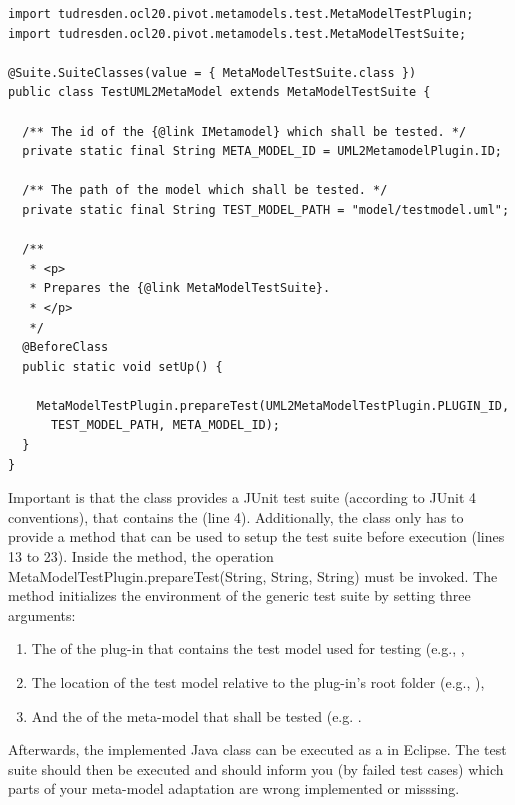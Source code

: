 \lstset{
  language=Java
}
\begin{lstlisting}[caption={An instantiation of the generic meta-model test suite.}, captionpos=b, label=list:metaModelTestSuite:constraints01, float]
import tudresden.ocl20.pivot.metamodels.test.MetaModelTestPlugin;
import tudresden.ocl20.pivot.metamodels.test.MetaModelTestSuite;

@Suite.SuiteClasses(value = { MetaModelTestSuite.class })
public class TestUML2MetaModel extends MetaModelTestSuite {

  /** The id of the {@link IMetamodel} which shall be tested. */
  private static final String META_MODEL_ID = UML2MetamodelPlugin.ID;

  /** The path of the model which shall be tested. */
  private static final String TEST_MODEL_PATH = "model/testmodel.uml";

  /**
   * <p>
   * Prepares the {@link MetaModelTestSuite}.
   * </p>
   */
  @BeforeClass
  public static void setUp() {

    MetaModelTestPlugin.prepareTest(UML2MetaModelTestPlugin.PLUGIN_ID, 
      TEST_MODEL_PATH, META_MODEL_ID);
  }
}
\end{lstlisting}

Important is that the class provides a JUnit test suite (according to JUnit 4 conventions), that contains the  (line 4). Additionally, the class only has to provide a  method that can be used to setup the test suite before execution (lines 13 to 23). Inside the  method, the operation MetaModelTestPlugin.prepareTest(String, String, String) must be invoked. The method initializes the environment of the generic test suite by setting three arguments:

\begin{enumerate}
	\item The  of the plug-in that contains the test model used for testing (e.g., ,
	\item The location of the test model relative to the plug-in's root folder (e.g., ),
	\item And the  of the meta-model that shall be tested (e.g. .
\end{enumerate}

Afterwards, the implemented Java class can be executed as a  in Eclipse. The test suite should then be executed and should inform you (by failed test cases) which parts of your meta-model adaptation are wrong implemented or misssing.
